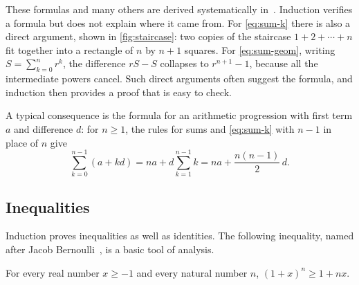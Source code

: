 These formulas and many others are derived systematically in~\cite{graham1994concrete}. Induction verifies a formula but does not explain where it came from. For \eqref{eq:sum-k} there is also a direct argument, shown in \cref{fig:staircase}: two copies of the staircase $1+2+\cdots+n$ fit together into a rectangle of $n$ by $n+1$ squares. For \eqref{eq:sum-geom}, writing $S=\sum_{k=0}^{n}r^k$, the difference $rS-S$ collapses to $r^{n+1}-1$, because all the intermediate powers cancel. Such direct arguments often suggest the formula, and induction then provides a proof that is easy to check.

\begin{figure}
\end{figure}

A typical consequence is the formula for an arithmetic progression with first term $a$ and difference $d$: for $n\ge1$, the rules for sums and \eqref{eq:sum-k} with $n-1$ in place of $n$ give
\[
\sum_{k=0}^{n-1}(a+kd)=na+d\sum_{k=1}^{n-1}k=na+\frac{n(n-1)}{2}\,d .
\]

\subsection{Inequalities}

Induction proves inequalities as well as identities. The following inequality, named after Jacob Bernoulli~\cite{mitrinovic1993bernoulli}, is a basic tool of analysis.

\begin{theorem}
\label{thm:bernoulli}
For every real number $x\ge-1$ and every natural number $n$, $(1+x)^n\ge1+nx$.
\end{theorem}

